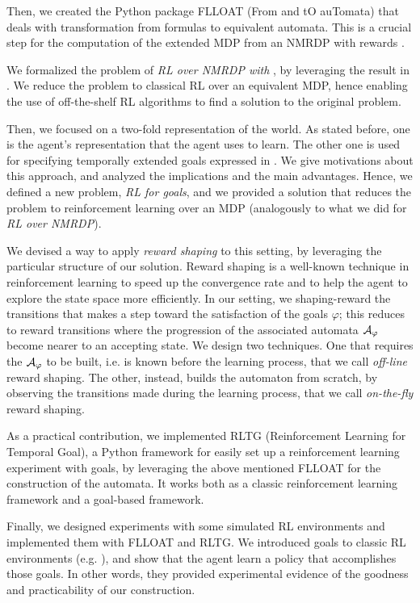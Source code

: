 Then, we created the  Python package FLLOAT (From \LTLf and \LDLf tO auTomata) that deals with transformation from \LLf formulas to equivalent automata. This is a crucial step for the computation of the extended MDP from an NMRDP with \LLf rewards \citep{AAAI1817342}.

We formalized the problem of \emph{RL over NMRDP with \LLf}, by leveraging the result in \citep{AAAI1817342}. We reduce the problem to classical RL over an equivalent MDP, hence enabling the use of off-the-shelf RL algorithms to find a solution to the original problem.

Then, we focused on a two-fold representation of the world. As stated before, one is the agent's representation that the agent uses to learn. The other one is used for specifying temporally extended goals expressed in \LLf. We give motivations about this approach, and analyzed the implications and the main advantages. Hence, we defined a new problem, \emph{RL for \LLf goals}, and we provided a solution that reduces the problem to reinforcement learning over an MDP (analogously to what we did for \emph{RL over NMRDP}).

We devised a way to apply \emph{reward shaping} to this setting, by leveraging the particular structure of our solution. Reward shaping is a well-known technique in reinforcement learning to speed up the convergence rate and to help the agent to explore the state space more efficiently. In our setting, we shaping-reward the transitions that makes a step toward the satisfaction of the \LLf goals $\varphi$; this reduces to reward transitions where the progression of the associated automata $\mathcal{A}_{\varphi}$ become nearer to an accepting state. We design two techniques. One that requires the $\mathcal{A}_{\varphi}$ to be built, i.e. is known before the learning process, that we call \emph{off-line} reward shaping. The other, instead, builds the automaton from scratch, by observing the transitions made during the learning process, that we call \emph{on-the-fly} reward shaping.

As a practical contribution, we implemented RLTG (Reinforcement Learning for Temporal Goal), a Python framework for easily set up a reinforcement learning experiment with \LLf goals, by leveraging the above mentioned FLLOAT for the construction of the automata. It works both as a classic reinforcement learning framework and a \LLf goal-based framework. 

Finally, we designed experiments with some simulated RL environments and implemented them with FLLOAT and RLTG. We introduced \LLf goals to classic RL environments (e.g. \Breakout), and show that the agent learn a policy that accomplishes those goals.
In other words, they provided experimental evidence of the goodness and practicability of our construction.


